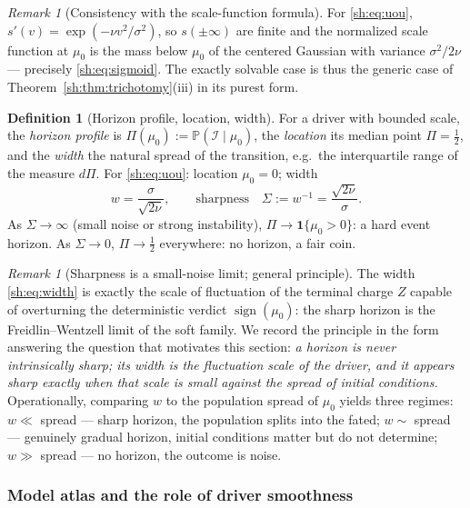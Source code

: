 \documentclass[11pt]{article}
\numberwithin{equation}{section}
\theoremstyle{plain}
\theoremstyle{definition}
\newtheorem{definition}[theorem]{Definition}
\theoremstyle{remark}
\newtheorem{remark}[theorem]{Remark}
\newcommand{\PP}{\mathbb{P}}
\newcommand{\one}{\mathbf{1}}
\newcommand{\Imm}{\mathcal{I}}
\begin{document}
\begin{remark}[Consistency with the scale-function formula]
\label{sh:rem:crosscheck}
For \eqref{sh:eq:uou}, $s'(v)=\exp(-\nu v^2/\sigma^2)$, so
$s(\pm\infty)$ are finite and the normalized scale function at $\mu_0$ is
the mass below $\mu_0$ of the centered Gaussian with variance
$\sigma^2/2\nu$ --- precisely \eqref{sh:eq:sigmoid}. The exactly solvable
case is thus the generic case of
Theorem~\ref{sh:thm:trichotomy}(iii) in its purest form.
\end{remark}

\begin{definition}[Horizon profile, location, width]\label{sh:def:width}
For a driver with bounded scale, the \emph{horizon profile} is
$\Pi(\mu_0):=\PP(\Imm\mid\mu_0)$, the \emph{location} its median point
$\Pi=\tfrac12$, and the \emph{width} the natural spread of the transition,
e.g.\ the interquartile range of the measure $d\Pi$. For
\eqref{sh:eq:uou}: location $\mu_0=0$; width
\begin{equation}\label{sh:eq:width}
w=\frac{\sigma}{\sqrt{2\nu}},\qquad\text{sharpness}\quad
\Sigma:=w^{-1}=\frac{\sqrt{2\nu}}{\sigma}.
\end{equation}
As $\Sigma\to\infty$ (small noise or strong instability),
$\Pi\to\one\{\mu_0>0\}$: a hard event horizon. As $\Sigma\to0$,
$\Pi\to\tfrac12$ everywhere: no horizon, a fair coin.
\end{definition}

\begin{remark}[Sharpness is a small-noise limit; general principle]
\label{sh:rem:FW}
The width \eqref{sh:eq:width} is exactly the scale of fluctuation of the
terminal charge $Z$ capable of overturning the deterministic verdict
$\operatorname{sign}(\mu_0)$: the sharp horizon is the Freidlin--Wentzell
limit \cite{FW12} of the soft family. We record the principle in the form
answering the question that motivates this section: \emph{a horizon is
never intrinsically sharp; its width is the fluctuation scale of the
driver, and it appears sharp exactly when that scale is small against the
spread of initial conditions.} Operationally, comparing $w$ to the
population spread of $\mu_0$ yields three regimes: $w\ll$ spread --- sharp
horizon, the population splits into the fated; $w\sim$ spread --- genuinely
gradual horizon, initial conditions matter but do not determine;
$w\gg$ spread --- no horizon, the outcome is noise.
\end{remark}

\subsubsection{Model atlas and the role of driver smoothness}
\label{sh:subsub:atlas}
\end{document}
